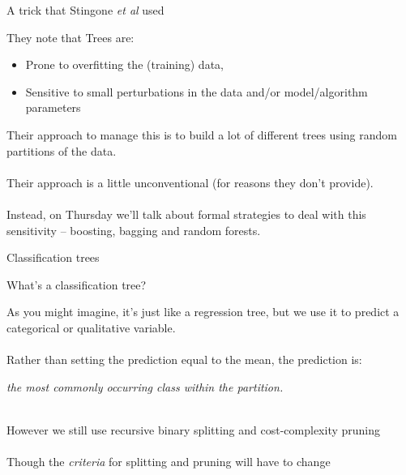 \documentclass[mathserif, aspectratio=169]{beamer}
\begin{document}
\begin{frame}{A trick that Stingone \textit{et al }used}

They note that Trees are: 
\begin{itemize}
\item Prone to overfitting the (training) data, 
\item Sensitive to small perturbations in the data and/or model/algorithm parameters
\end{itemize}

Their approach to manage this is to build a lot of different trees using random partitions of the data.  \\~\\
Their approach is a little unconventional (for  reasons they don't provide).\\~\\

Instead, on Thursday we'll talk about formal strategies to deal with this sensitivity -- boosting, bagging and random forests.  

\end{frame}

\begin{frame}
\begin{center}
{\LARGE Classification trees}
\end{center}
\end{frame}

\begin{frame}{What's a classification tree?}

As you might imagine, it's just like a regression tree, but we use it to predict a categorical or qualitative variable.  \\~\\

Rather than setting the prediction equal to the mean, the prediction is:
\pause
\begin{center}
 \textit{the most commonly occurring class within the partition.  \\~\\}
\end{center}

However we still use recursive binary splitting and cost-complexity pruning\\~\\

Though the \textit{criteria} for splitting and pruning will have to change

\end{frame}
\end{document}

